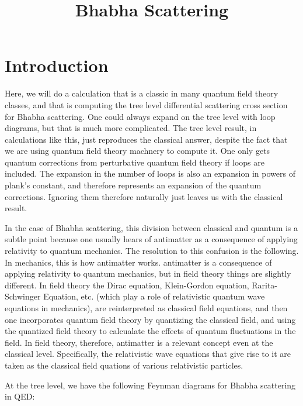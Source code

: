 \documentclass[a4]{article}
\begin{document}
    \title{Bhabha Scattering}
    \maketitle

    \section*{Introduction}

    Here, we will do a calculation that is a classic in many quantum field theory classes, and that is computing the tree level differential scattering cross section for Bhabha scattering.
    One could always expand on the tree level with loop diagrams, but that is much more complicated. The tree level result, in calculations like this, just reproduces the classical answer,
    despite the fact that we are using quantum field theory machnery to compute it. One only gets quantum corrections from perturbative quantum field theory if loops are included. The 
    expansion in the number of loops is also an expansion in powers of plank's constant, and therefore represents an expansion of the quantum corrections. Ignoring them therefore naturally
    just leaves us with the classical result. 

    In the case of Bhabha scattering, this division between classical and quantum is a subtle point because one usually hears of antimatter as a consequence of applying relativity to quantum 
    mechanics. The resolution to this confusion is the following. In mechanics, this is how antimatter works. antimatter is a consequence of applying relativity to quantum mechanics, but in
    field theory things are slightly different. In field theory the Dirac equation, Klein-Gordon equation, Rarita-Schwinger Equation, etc. (which play a role of relativistic quantum wave 
    equations in mechanics), are reinterpreted as classical field equations, and then one incorporates quantum field theory by quantizing the classical field, and using the quantized field
    theory to calcualate the effects of quantum fluctuations in the field. In field theory, therefore, antimatter is a relevant concept even at the classical level. Specifically, the 
    relativistic wave equations that give rise to it are taken as the classical field quations of various relativistic particles. 

    At the tree level, we have the following Feynman diagrams for Bhabha scattering in QED:

\end{document}
